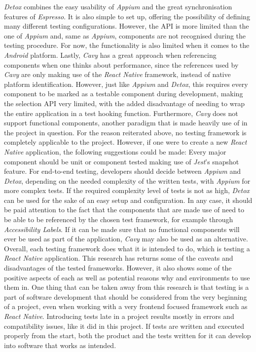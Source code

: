 \newline
\textit{Detox} combines the easy usability of \textit{Appium} and the great synchronisation features of \textit{Espresso}. It is also simple to set up, offering the possibility of defining many different testing configurations. However, the API is more limited than the one of \textit{Appium} and, same as \textit{Appium}, components are not recognised during the testing procedure. For now, the functionality is also limited when it comes to the \textit{Android} platform.
\newline
Lastly, \textit{Cavy} has a great approach when referencing components when one thinks about performance, since the references used by \textit{Cavy} are only making use of the \textit{React Native} framework, instead of native platform identification. However, just like \textit{Appium} and \textit{Detox}, this requires every component to be marked as a testable component during development, making the selection API very limited, with the added disadvantage of needing to wrap the entire application in a test hooking function. Furthermore, \textit{Cavy} does not support functional components, another paradigm that is made heavily use of in the project in question.
\newline
For the reason reiterated above, no testing framework is completely applicable to the project. However, if one were to create a new \textit{React Native} application, the following suggestions could be made:
\newline
Every major component should be unit or component tested making use of \textit{Jest}'s snapshot feature. For end-to-end testing, developers should decide between \textit{Appium} and \textit{Detox}, depending on the needed complexity of the written tests, with \textit{Appium} for more complex tests. If the required complexity level of tests is not as high, \textit{Detox} can be used for the sake of an easy setup and configuration. In any case, it should be paid attention to the fact that the components that are made use of need to be able to be referenced by the chosen test framework, for example through \textit{Accessibility Labels}. If it can be made sure that no functional components will ever be used as part of the application, \textit{Cavy} may also be used as an alternative.
\newline
Overall, each testing framework does what it is intended to do, which is testing a \textit{React Native} application. This research has returns some of the caveats and disadvantages of the tested frameworks. However, it also shows some of the positive aspects of each as well as potential reasons why and environments to use them in. One thing that can be taken away from this research is that testing is a part of software development that should be considered from the very beginning of a project, even when working with a very frontend focused framework such as \textit{React Native}. Introducing tests late in a project results mostly in errors and compatibility issues, like it did in this project. If tests are written and executed properly from the start, both the product and the tests written for it can develop into software that works as intended.